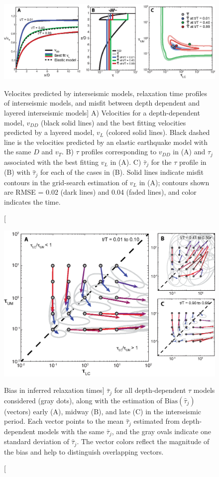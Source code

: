 \begin{figure}
\includegraphics{ch1/figures/Figure2.eps}
\caption
[Velocites predicted by interseismic models, relaxation time profiles
of interseismic models, and misfit between depth dependent and layered
interseismic models]
{A) Velocities for a depth-dependent model, $v_{DD}$ (black
solid lines) and the best fitting velocities predicted by a layered
model, $v_{L}$ (colored solid lines).  Black dashed line is the
velocities predicted by an elastic earthquake model with the same $D$
and $v_{T}$.  B) $\tau$ profiles corresponding to $v_{DD}$ in (A) and
$\hat{\tau}_j$ associated with the best fitting $v_{L}$ in (A).  C)
$\bar{\tau}_j$ for the $\tau$ profile in (B) with $\hat{\tau}_j$ for
each of the cases in (B). Solid lines indicate misfit contours in the
grid-search estimation of $v_{L}$ in (A); contours shown are RMSE =
0.02 (dark lines) and 0.04 (faded lines), and color indicates the
time.}
\label{ch1:fig:2}
\end{figure}

\begin{figure}
\includegraphics{ch1/figures/Figure3.eps}
\caption
[Bias in inferred relaxation times]
{$\bar{\tau}_j$ for all depth-dependent $\tau$ models considered (gray
dots), along with the estimation of $\mathrm{Bias}(\hat{\tau}_j)$
(vectors) early (A), midway (B), and late (C) in the interseismic
period.  Each vector points to the mean $\hat{\tau}_j$ estimated from
depth-dependent models with the same $\bar{\tau}_j$, and the gray
ovals indicate one standard deviation of $\hat{\tau}_j$.  The vector
colors reflect the magnitude of the bias and help to distinguish
overlapping vectors.}
\label{ch1:fig:3} 
\end{figure}

